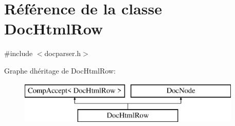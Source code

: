 \hypertarget{class_doc_html_row}{}\section{Référence de la classe Doc\+Html\+Row}
\label{class_doc_html_row}


{\ttfamily \#include $<$docparser.\+h$>$}

Graphe d\textquotesingle{}héritage de Doc\+Html\+Row\+:\begin{figure}[H]
\begin{center}
\leavevmode
\includegraphics[height=2.000000cm]{class_doc_html_row}
\end{center}
\end{figure}
